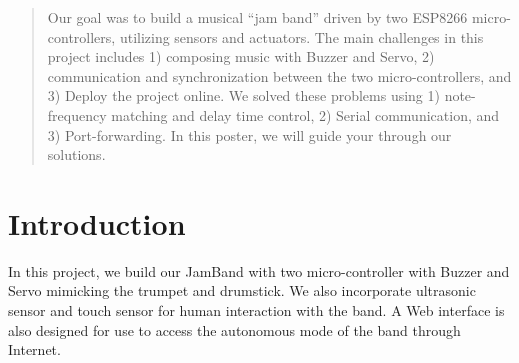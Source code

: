 \documentclass[a0,landscape]{a0poster}
\begin{document}
\vspace{1cm} %


\begin{multicols}{4} %


\color{Navy} %

\begin{abstract}
Our goal was to build a musical “jam band” driven by two ESP8266 micro-controllers, utilizing sensors and actuators. The main challenges in this project includes 1) composing music with Buzzer and Servo, 2) communication and synchronization between the two micro-controllers, and 3) Deploy the project online. We solved these problems using 1) note-frequency matching and delay time control, 2) Serial communication, and 3) Port-forwarding. In this poster, we will guide your through our solutions. 
\end{abstract}


\color{SaddleBrown} %

\section*{Introduction}
In this project, we build our JamBand with two micro-controller with Buzzer and Servo mimicking the trumpet and drumstick. We also incorporate ultrasonic sensor and touch sensor for human interaction with the band. A Web interface is also designed for use to access the autonomous mode of the band through Internet. 



\end{multicols}
\end{document}
